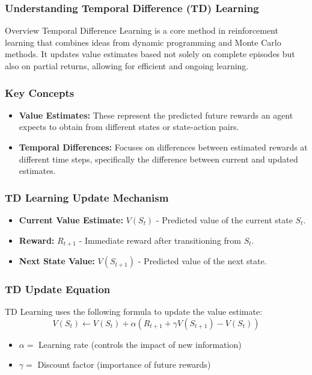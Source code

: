 \documentclass[aspectratio=169]{beamer}
\begin{document}
\begin{frame}
    \titlepage
\end{frame}

\begin{frame}[fragile]
    \frametitle{Understanding Temporal Difference (TD) Learning}
    \begin{block}{Overview}
        Temporal Difference Learning is a core method in reinforcement learning that combines ideas from dynamic programming and Monte Carlo methods. It updates value estimates based not solely on complete episodes but also on partial returns, allowing for efficient and ongoing learning.
    \end{block}
\end{frame}

\begin{frame}[fragile]
    \frametitle{Key Concepts}
    \begin{itemize}
        \item \textbf{Value Estimates:} 
        These represent the predicted future rewards an agent expects to obtain from different states or state-action pairs.
        \item \textbf{Temporal Differences:} 
        Focuses on differences between estimated rewards at different time steps, specifically the difference between current and updated estimates.
    \end{itemize}
\end{frame}

\begin{frame}[fragile]
    \frametitle{TD Learning Update Mechanism}
    \begin{itemize}
        \item \textbf{Current Value Estimate:} $V(S_t)$ - Predicted value of the current state $S_t$.
        \item \textbf{Reward:} $R_{t+1}$ - Immediate reward after transitioning from $S_t$.
        \item \textbf{Next State Value:} $V(S_{t+1})$ - Predicted value of the next state.
    \end{itemize}
\end{frame}

\begin{frame}[fragile]
    \frametitle{TD Update Equation}
    TD Learning uses the following formula to update the value estimate:
    \begin{equation}
        V(S_t) \leftarrow V(S_t) + \alpha \left( R_{t+1} + \gamma V(S_{t+1}) - V(S_t) \right)
    \end{equation}
    \begin{itemize}
        \item $\alpha =$ Learning rate (controls the impact of new information)
        \item $\gamma =$ Discount factor (importance of future rewards)
    \end{itemize}
\end{frame}
\end{document}
